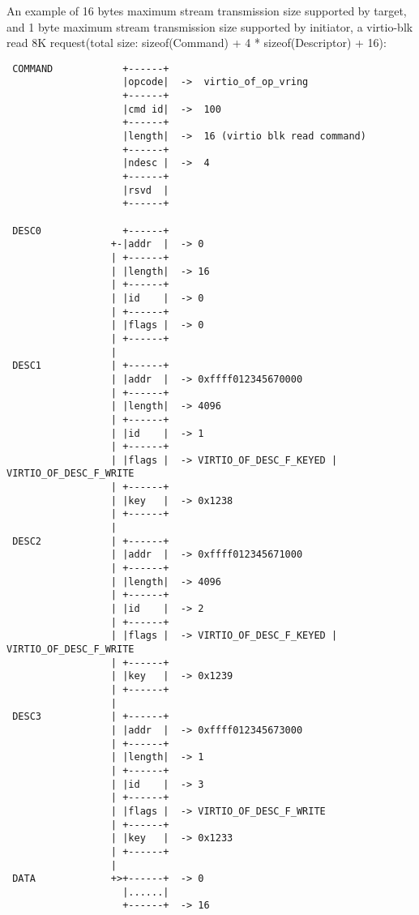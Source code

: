 An example of 16 bytes maximum stream transmission size supported by target,
and 1 byte maximum stream transmission size supported by initiator, a virtio-blk
read 8K request(total size: sizeof(Command) + 4 * sizeof(Descriptor) + 16):
\begin{lstlisting}
 COMMAND            +------+
                    |opcode|  ->  virtio_of_op_vring
                    +------+
                    |cmd id|  ->  100
                    +------+
                    |length|  ->  16 (virtio blk read command)
                    +------+
                    |ndesc |  ->  4
                    +------+
                    |rsvd  |
                    +------+

 DESC0              +------+
                  +-|addr  |  -> 0
                  | +------+
                  | |length|  -> 16
                  | +------+
                  | |id    |  -> 0
                  | +------+
                  | |flags |  -> 0
                  | +------+
                  |
 DESC1            | +------+
                  | |addr  |  -> 0xffff012345670000
                  | +------+
                  | |length|  -> 4096
                  | +------+
                  | |id    |  -> 1
                  | +------+
                  | |flags |  -> VIRTIO_OF_DESC_F_KEYED | VIRTIO_OF_DESC_F_WRITE
                  | +------+
                  | |key   |  -> 0x1238
                  | +------+
                  |
 DESC2            | +------+
                  | |addr  |  -> 0xffff012345671000
                  | +------+
                  | |length|  -> 4096
                  | +------+
                  | |id    |  -> 2
                  | +------+
                  | |flags |  -> VIRTIO_OF_DESC_F_KEYED | VIRTIO_OF_DESC_F_WRITE
                  | +------+
                  | |key   |  -> 0x1239
                  | +------+
                  |
 DESC3            | +------+
                  | |addr  |  -> 0xffff012345673000
                  | +------+
                  | |length|  -> 1
                  | +------+
                  | |id    |  -> 3
                  | +------+
                  | |flags |  -> VIRTIO_OF_DESC_F_WRITE
                  | +------+
                  | |key   |  -> 0x1233
                  | +------+
                  |
 DATA             +>+------+  -> 0
                    |......|
                    +------+  -> 16
\end{lstlisting}

